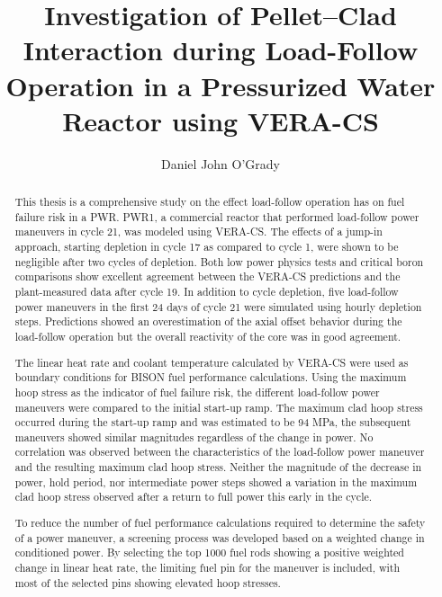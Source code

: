 \documentclass[edeposit,fullpage,11pt]{uiucthesis2009}
\begin{document}
\title{Investigation of Pellet--Clad Interaction during Load-Follow\\
       Operation in a Pressurized Water Reactor using VERA-CS}
\author{Daniel John O'Grady}
\msthesis
{}
\maketitle

\frontmatter

\begin{abstract}
This thesis is a comprehensive study on the effect load-follow operation has on fuel failure risk in a PWR. 
PWR1, a commercial reactor that performed load-follow power maneuvers in cycle 21, was modeled using VERA-CS. 
The effects of a jump-in approach, starting depletion in cycle 17 as compared to cycle 1,  were shown to be negligible after two cycles of depletion.
Both low power physics tests and critical boron comparisons show excellent agreement between the VERA-CS predictions and the plant-measured data after cycle 19.
In addition to cycle depletion, five load-follow power maneuvers in the first 24 days of cycle 21 were simulated using hourly depletion steps. 
Predictions showed an overestimation of the axial offset behavior during the load-follow operation but the overall reactivity of the core was in good agreement.

The linear heat rate and coolant temperature calculated by VERA-CS were used as boundary conditions for BISON fuel performance calculations.
Using the maximum hoop stress as the indicator of fuel failure risk, the different load-follow power maneuvers were compared to the initial start-up ramp.
The maximum clad hoop stress occurred during the start-up ramp and was estimated to be 94 MPa, the subsequent maneuvers showed similar magnitudes regardless of the change in power. 
No correlation was observed between the characteristics of the load-follow power maneuver and the resulting maximum clad hoop stress. 
Neither the magnitude of the decrease in power, hold period, nor intermediate power steps showed a variation in the maximum clad hoop stress observed after a return to full power this early in the cycle.

To reduce the number of fuel performance calculations required to determine the safety of a power maneuver, a screening process was developed based on a weighted change in conditioned power.
By selecting the top 1000 fuel rods showing a positive weighted change in linear heat rate, the limiting fuel pin for the maneuver is included, with most of the selected pins showing elevated hoop stresses. 
\end{abstract}
\end{document}

